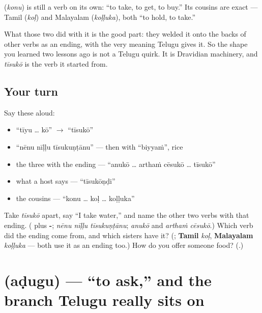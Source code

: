 \begin{cousinweb}
\textbf{} (\emph{konu}) is still a verb on its own: \textquotedblleft{}to take, to get, to buy.\textquotedblright{} Its cousins are exact — Tamil \textbf{} (\emph{koḷ}) and Malayalam \textbf{} (\emph{koḷḷuka}), both \textquotedblleft{}to hold, to take.\textquotedblright{}

What those two did with it is the good part: they welded it onto the backs of other verbs as an ending, with the very meaning Telugu gives it. So the shape you learned two lessons ago is not a Telugu quirk. It is Dravidian machinery, and \emph{tīsukō} is the verb it started from.
\end{cousinweb}

\subsection*{Your turn}
Say these aloud:

\begin{itemize}
\raggedright
  \item \textquotedblleft{}tīyu … kō\textquotedblright{} $\to$ \textquotedblleft{}tīsukō\textquotedblright{}
  \item \textquotedblleft{}nēnu nīḷḷu tīsukuṇṭānu\textquotedblright{} — then with \textquotedblleft{}biyyaṁ\textquotedblright{}, rice
  \item the three with the ending — \textquotedblleft{}anukō … arthaṁ cēsukō … tīsukō\textquotedblright{}
  \item what a host says — \textquotedblleft{}tīsukōṇḍi\textquotedblright{}
  \item the cousins — \textquotedblleft{}konu … koḷ … koḷḷuka\textquotedblright{}
\end{itemize}

\begin{tcolorbox}[breakable,colback=teal!4,colframe=teal!35!black,title={Before you move on}]
Take \emph{tīsukō} apart, say \textquotedblleft{}I take water,\textquotedblright{} and name the other two verbs with that ending. (\emph{\textbf{}} plus \textbf{-}; \emph{nēnu nīḷḷu tīsukuṇṭānu}; \emph{anukō} and \emph{arthaṁ cēsukō}.) Which verb did the ending come from, and which sisters have it? (\emph{\textbf{}}; \textbf{Tamil} \emph{koḷ}, \textbf{Malayalam} \emph{koḷḷuka} — both use it as an ending too.) How do you offer someone food? (\emph{\textbf{}}.)
\end{tcolorbox}
\section[\texorpdfstring{\te{అడుగు} (aḍugu)}{అడుగు (aḍugu)}]{ (aḍugu) — \textquotedblleft{}to ask,\textquotedblright{} and the branch Telugu really sits on}

